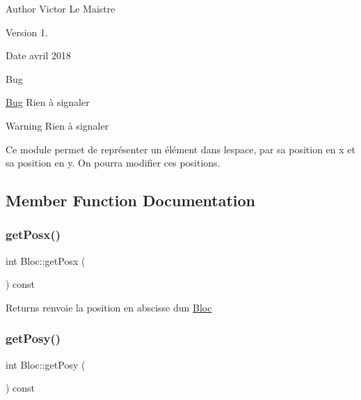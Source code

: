 \begin{DoxyAuthor}{Author}
Victor Le Maistre 
\end{DoxyAuthor}
\begin{DoxyVersion}{Version}
1. 
\end{DoxyVersion}
\begin{DoxyDate}{Date}
avril 2018 
\end{DoxyDate}
\begin{DoxyRefDesc}{Bug}
\item[\hyperlink{bug__bug000001}{Bug}]Rien à signaler \end{DoxyRefDesc}
\begin{DoxyWarning}{Warning}
Rien à signaler
\end{DoxyWarning}
Ce module permet de représenter un élément dans l\textquotesingle{}espace, par sa position en x et sa position en y. On pourra modifier ces positions. 

\subsection{Member Function Documentation}
\mbox{\label{classBloc_a1600764b66f921e77cb5ca8d2946a3e2}} 
\subsubsection{\texorpdfstring{get\+Posx()}{getPosx()}}
{\footnotesize\ttfamily int Bloc\+::get\+Posx (\begin{DoxyParamCaption}{ }\end{DoxyParamCaption}) const}

\begin{DoxyReturn}{Returns}
renvoie la position en abscisse d\textquotesingle{}un \hyperlink{classBloc}{Bloc} 
\end{DoxyReturn}
\mbox{\label{classBloc_a362522a2a75cefdbba44a544cd7f1a75}} 
\subsubsection{\texorpdfstring{get\+Posy()}{getPosy()}}
{\footnotesize\ttfamily int Bloc\+::get\+Posy (\begin{DoxyParamCaption}{ }\end{DoxyParamCaption}) const}

